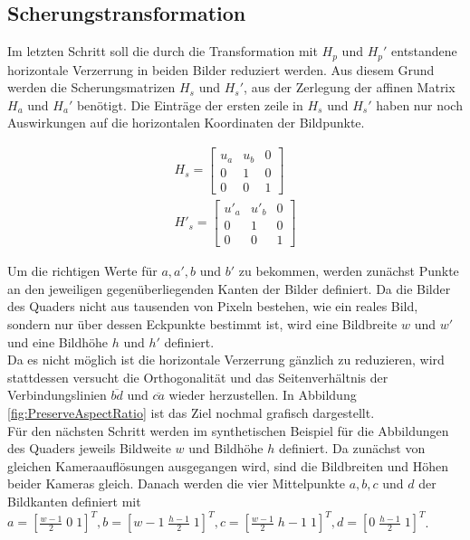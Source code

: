 \subsection{Scherungstransformation}

Im letzten Schritt soll die durch die Transformation mit $H_p$ und $H_p'$ entstandene horizontale Verzerrung in beiden Bilder reduziert werden. Aus diesem Grund werden die Scherungsmatrizen $H_s$ und $H_s'$, aus der Zerlegung der affinen Matrix $H_a$ und $H_a'$ benötigt. Die Einträge der ersten zeile in $H_s$ und $H_s'$ haben nur noch Auswirkungen auf die horizontalen Koordinaten der Bildpunkte.


\begin{gather}
	H_s =\begin{bmatrix}
		u_a&u_b&0\\
		0&1&0\\
		0&0&1
	\end{bmatrix}\\
	H'_s =\begin{bmatrix}
		u'_a&u'_b&0\\
		0&1&0\\
		0&0&1
	\end{bmatrix}
\end{gather}

Um die richtigen Werte für $a, a', b$ und $b'$ zu bekommen, werden zunächst Punkte an den jeweiligen gegenüberliegenden Kanten der Bilder definiert. Da die Bilder des Quaders nicht aus tausenden von Pixeln bestehen, wie ein reales Bild, sondern nur über dessen Eckpunkte bestimmt ist, wird eine Bildbreite $w$ und $w'$ und eine Bildhöhe $h$ und $h'$ definiert. \\

Da es nicht möglich ist die horizontale Verzerrung gänzlich zu reduzieren, wird stattdessen versucht die Orthogonalität und das Seitenverhältnis der Verbindungslinien $\overline{bd}$ und $\overline{ca}$ wieder herzustellen. In Abbildung \ref{fig:PreserveAspectRatio} ist das Ziel nochmal grafisch dargestellt.\\

Für den nächsten Schritt werden im synthetischen Beispiel für die Abbildungen des Quaders jeweils Bildweite $w$ und Bildhöhe $h$ definiert. Da zunächst von gleichen Kameraauflösungen ausgegangen wird, sind die Bildbreiten und Höhen beider Kameras gleich. Danach werden die vier Mittelpunkte $a,b,c$ und $d$ der Bildkanten definiert mit $a = [\frac{w-1}{2} \; 0 \; 1]^T, b = [w-1 \; \frac{h-1}{2}\; 1]^T, c = [\frac{w-1}{2} \; h-1 \; 1]^T, d = [0 \; \frac{h-1}{2} \; 1]^T$.

